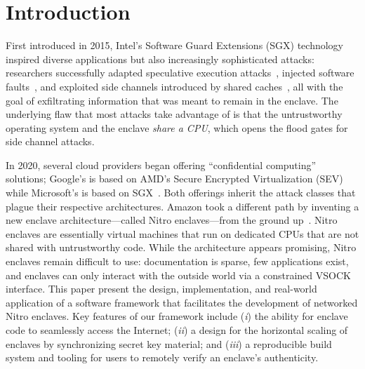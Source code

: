 \section{Introduction}

First introduced in 2015, Intel's Software Guard Extensions (SGX) technology
inspired diverse applications but also increasingly sophisticated attacks:
researchers successfully adapted speculative execution
attacks~\cite{VanBulck2018a}, injected software faults~\cite{Murdock2020a}, and
exploited side channels introduced by shared caches~\cite{Brasser2017a}, all
with the goal of exfiltrating information that was meant to remain in the
enclave.  The underlying flaw that most attacks take advantage of is that the
untrustworthy operating system and the enclave \emph{share a CPU}, which opens
the flood gates for side channel attacks.

In 2020, several cloud providers began offering ``confidential computing''
solutions; Google's is based on AMD's Secure Encrypted Virtualization
(SEV)~\cite{googlecc} while Microsoft's is based on SGX~\cite{azurecc}.  Both
offerings inherit the attack classes that plague their respective architectures.
Amazon took a different path by inventing a new enclave architecture---called
Nitro enclaves---from the ground up~\cite{nitro-enclaves}.  Nitro enclaves are
essentially virtual machines that run on dedicated CPUs that are not shared with
untrustworthy code.  While the architecture appears promising, Nitro enclaves
remain difficult to use: documentation is sparse, few applications exist, and
enclaves can only interact with the outside world via a constrained VSOCK
interface.  This paper present the design, implementation, and real-world
application of a software framework that facilitates the development of
networked Nitro enclaves.  Key features of our framework include
(\emph{i}) the ability for enclave code to seamlessly access the Internet;
(\emph{ii}) a design for the horizontal scaling of enclaves by synchronizing
secret key material; and
(\emph{iii}) a reproducible build system and tooling for users to remotely
verify an enclave's authenticity.


